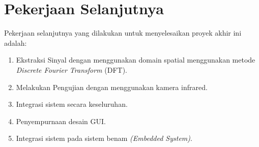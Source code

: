 \section{Pekerjaan Selanjutnya}
Pekerjaan selanjutnya yang dilakukan untuk menyelesaikan proyek akhir ini adalah:
\begin{enumerate}
    \item Ekstraksi Sinyal dengan menggunakan domain spatial menggunakan metode \textit{Discrete Fourier Transform} (DFT).
    \item Melakukan Pengujian dengan menggunakan kamera infrared.
    \item Integrasi sistem secara keseluruhan.
    \item Penyempurnaan desain GUI.
    \item Integrasi sistem pada sistem benam \textit{(Embedded System)}.
\end{enumerate}